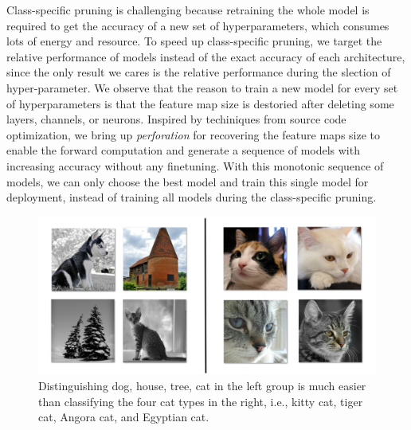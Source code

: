 \documentclass[pageno]{jpaper}
\begin{document}
Class-specific pruning is challenging because retraining the whole model is required to get the accuracy of a new set of hyperparameters, which consumes lots of energy and resource. To speed up class-specific pruning, we target the relative performance of models instead of the exact accuracy of each architecture, since the only result we cares is the relative performance during the slection of hyper-parameter. We observe that the reason to train a new model for every set of hyperparameters is that the feature map size is destoried after deleting some layers, channels, or neurons. Inspired by techiniques from source code optimization, we bring up \textit{perforation} for recovering the feature maps size to enable the forward computation and generate a sequence of models with increasing accuracy without any finetuning. With this monotonic sequence of models, we can only choose the best model and train this single model for deployment, instead of training all models during the class-specific pruning.

\begin{figure}
    \centering
    \includegraphics [scale=0.12] {twoGroups.png}
    \caption{Distinguishing dog, house, tree, cat in the left group is much easier than classifying the four cat types in the right, i.e., kitty cat, tiger cat, Angora cat, and Egyptian cat. }
    \label{fig:classEffect}
\end{figure}
\end{document}
